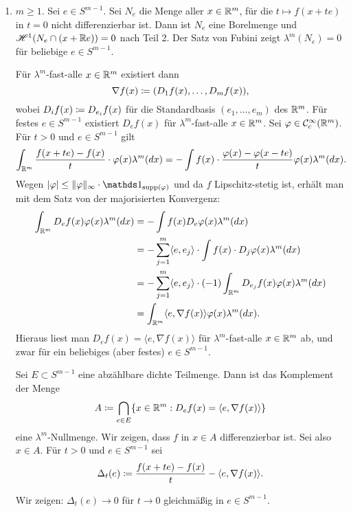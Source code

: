 \documentclass[a4paper,twoside,DIV15,BCOR12mm]{scrbook}
\newcommand{\ind}{\mathds 1}
\newcommand{\HM}{\mathscr H}
\begin{document}
\begin{beweis}
\begin{enumerate}[{Teil} 1:]
\item $m\ge 1$. Sei $e\in S^{m-1}$. Sei $N_e$ die Menge aller $x\in\mathbb{R}^m$, für die $t \mapsto f(x+te)$ in $t=0$ nicht differenzierbar ist. Dann ist $N_e$ eine Borelmenge und $\HM^1(N_e \cap (x+\MdR e)) = 0$ nach Teil 2. Der Satz von Fubini zeigt $\lambda^m(N_e) = 0$ für beliebige $e\in S^{m-1}$.

Für $\lambda^m$-fast-alle $x\in\mathbb{R}^m$ existiert dann 
\[
\nabla f(x) \da (D_1 f(x), \ldots, D_mf(x)),
\]
wobei $D_if(x) \da D_{e_i}f(x)$ für die Standardbasis $(e_1,\ldots,e_m)$ des $\mathbb{R}^m$. Für festes $e\in S^{m-1}$ existiert $D_ef(x)$ für $\lambda^m$-fast-alle $x\in\mathbb{R}^m$. Sei $\varphi \in\mathcal C^\infty_c(\mathbb{R}^m)$. Für $t>0$ und $e\in S^{m-1}$ gilt
\[
\int_{\mathbb{R}^m} \frac{f(x+t e) - f(x)}{t} \cdot \varphi(x) \lambda^m(dx)
= 
-\int f(x) \cdot \frac{\varphi(x) - \varphi(x-t e)}{t}\varphi(x) \lambda^m(dx).
\]
Wegen $|\varphi| \le \|\varphi\|_\infty \cdot \ind_{\supp(\varphi)}$ und da $f$ Lipschitz-stetig ist, erhält man   mit dem Satz von der majorisierten Konvergenz:
\begin{align*}
\int_{\mathbb{R}^m} D_ef(x) \varphi(x) \lambda^m(dx)
&= -\int f(x) D_e\varphi(x) \lambda^m(dx) \\
&= - \sum_{j=1}^m \langle e, e_j\rangle \cdot \int f(x) \cdot D_j \varphi(x)\lambda^m(dx) \\
&= - \sum_{j=1}^m \langle e, e_j\rangle \cdot (-1) \int_{\mathbb{R}^m} D_{e_j} f(x) \varphi(x) \lambda^m(dx) \\
&= \int_{\mathbb{R}^m} \langle e, \nabla f(x) \rangle \varphi(x) \lambda^m(dx).
\end{align*}
Hieraus liest man $D_ef(x) = \langle e,\nabla f(x) \rangle$ für $\lambda^m$-fast-alle $x\in\mathbb{R}^m$ ab, und zwar   
für ein beliebiges (aber festes) $e\in S^{m-1}$.

Sei $E\subset S^{m-1}$ eine abzählbare dichte Teilmenge. Dann ist das Komplement der Menge 
\[
A \da \bigcap_{e\in E}\{x\in\MdR^m : D_ef(x) = \langle e, \nabla f(x) \rangle\}
\]
eine $\lambda^m$-Nullmenge. Wir zeigen, dass $f$ in $x\in A$ differenzierbar ist. Sei also $x\in A$. Für $t>0$ und $e\in S^{m-1}$ sei
\[
\Delta_t(e) \da \frac{f(x+t e)- f(x)}{t} - \langle e,\nabla f(x) \rangle.
\]

Wir zeigen: $\Delta_t(e) \to 0$ für $t\to 0$ gleichmäßig in $e\in S^{m-1}$.


\end{enumerate}
\end{beweis}
\end{document}
